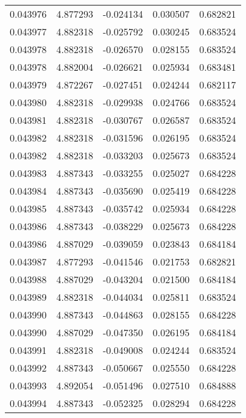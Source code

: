 \begin{tabular}{lrrrr}
0.043976    &  4.877293 & -0.024134 &  0.030507 &             0.682821 \\
0.043977    &  4.882318 & -0.025792 &  0.030245 &             0.683524 \\
0.043978    &  4.882318 & -0.026570 &  0.028155 &             0.683524 \\
0.043978    &  4.882004 & -0.026621 &  0.025934 &             0.683481 \\
0.043979    &  4.872267 & -0.027451 &  0.024244 &             0.682117 \\
0.043980    &  4.882318 & -0.029938 &  0.024766 &             0.683524 \\
0.043981    &  4.882318 & -0.030767 &  0.026587 &             0.683524 \\
0.043982    &  4.882318 & -0.031596 &  0.026195 &             0.683524 \\
0.043982    &  4.882318 & -0.033203 &  0.025673 &             0.683524 \\
0.043983    &  4.887343 & -0.033255 &  0.025027 &             0.684228 \\
0.043984    &  4.887343 & -0.035690 &  0.025419 &             0.684228 \\
0.043985    &  4.887343 & -0.035742 &  0.025934 &             0.684228 \\
0.043986    &  4.887343 & -0.038229 &  0.025673 &             0.684228 \\
0.043986    &  4.887029 & -0.039059 &  0.023843 &             0.684184 \\
0.043987    &  4.877293 & -0.041546 &  0.021753 &             0.682821 \\
0.043988    &  4.887029 & -0.043204 &  0.021500 &             0.684184 \\
0.043989    &  4.882318 & -0.044034 &  0.025811 &             0.683524 \\
0.043990    &  4.887343 & -0.044863 &  0.028155 &             0.684228 \\
0.043990    &  4.887029 & -0.047350 &  0.026195 &             0.684184 \\
0.043991    &  4.882318 & -0.049008 &  0.024244 &             0.683524 \\
0.043992    &  4.887343 & -0.050667 &  0.025550 &             0.684228 \\
0.043993    &  4.892054 & -0.051496 &  0.027510 &             0.684888 \\
0.043994    &  4.887343 & -0.052325 &  0.028294 &             0.684228 \\

\end{tabular}
